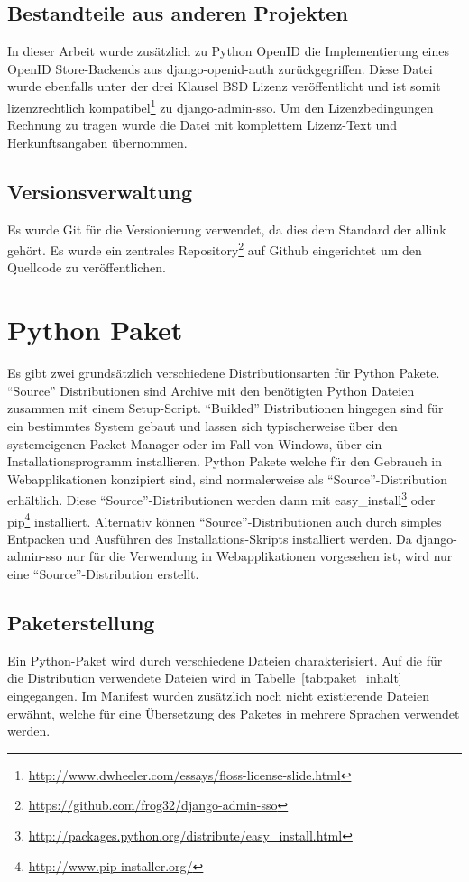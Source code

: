 \subsection{Bestandteile aus anderen Projekten}
\label{sub:bestandteile_aus_anderen_projekten}
In dieser Arbeit wurde zusätzlich zu Python OpenID die Implementierung eines OpenID Store-Backends aus django-openid-auth zurückgegriffen. Diese Datei wurde ebenfalls unter der drei Klausel BSD Lizenz veröffentlicht und ist somit lizenzrechtlich kompatibel\footnote{\url{http://www.dwheeler.com/essays/floss-license-slide.html}} zu django-admin-sso. Um den Lizenzbedingungen Rechnung zu tragen wurde die Datei mit komplettem Lizenz-Text und Herkunftsangaben übernommen.

\subsection{Versionsverwaltung}
\label{sub:versionsverwaltung}
Es wurde \gls{Git} für die Versionierung verwendet, da dies dem Standard der allink gehört. Es wurde ein zentrales Repository\footnote{\url{https://github.com/frog32/django-admin-sso}} auf Github eingerichtet um den Quellcode zu veröffentlichen.

\section{Python Paket}
\label{sec:Python Paket}
Es gibt zwei grundsätzlich verschiedene Distributionsarten für Python Pakete. ``Source'' Distributionen sind Archive mit den benötigten Python Dateien zusammen mit einem Setup-Script. ``Builded'' Distributionen hingegen sind für ein bestimmtes System gebaut und lassen sich typischerweise über den systemeigenen Packet Manager oder im Fall von Windows, über ein Installationsprogramm installieren. Python Pakete welche für den Gebrauch in Webapplikationen konzipiert sind, sind normalerweise als ``Source''-Distribution erhältlich. Diese ``Source''-Distributionen werden dann mit easy\_install\footnote{\url{http://packages.python.org/distribute/easy_install.html}} oder pip\footnote{\url{http://www.pip-installer.org/}} installiert. Alternativ können ``Source''-Distributionen auch durch simples Entpacken und Ausführen des Installations-Skripts installiert werden. Da django-admin-sso nur für die Verwendung in Webapplikationen vorgesehen ist, wird nur eine ``Source''-Distribution erstellt.

\subsection{Paketerstellung}
\label{sub:paketerstellung}
Ein Python-Paket wird durch verschiedene Dateien charakterisiert. Auf die für die Distribution verwendete Dateien wird in Tabelle~\ref{tab:paket_inhalt} eingegangen. Im Manifest wurden zusätzlich noch nicht existierende Dateien erwähnt, welche für eine Übersetzung des Paketes in mehrere Sprachen verwendet werden.

